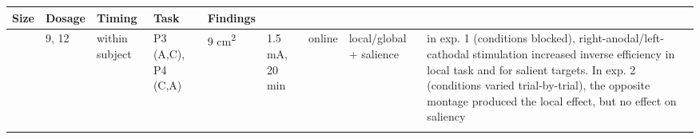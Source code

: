 \documentclass[11pt,]{memoir}
\begin{document}
\begin{longtable}[]{@{}lllllllll@{}}
\begin{minipage}[b]{0.04\columnwidth}
Size\strut
\end{minipage} & \begin{minipage}[b]{0.05\columnwidth}\raggedright
Dosage\strut
\end{minipage} & \begin{minipage}[b]{0.05\columnwidth}\raggedright
Timing\strut
\end{minipage} & \begin{minipage}[b]{0.08\columnwidth}\raggedright
Task\strut
\end{minipage} & \begin{minipage}[b]{0.27\columnwidth}\raggedright
Findings\strut
\end{minipage}\tabularnewline
\midrule
\endhead
\begin{minipage}[t]{0.08\columnwidth}\raggedright
\textcite{Bardi2013}\strut
\end{minipage} & \begin{minipage}[t]{0.03\columnwidth}\raggedright
9,
12\strut
\end{minipage} & \begin{minipage}[t]{0.05\columnwidth}\raggedright
within
subject\strut
\end{minipage} & \begin{minipage}[t]{0.12\columnwidth}\raggedright
P3 (A,C), P4 (C,A)\strut
\end{minipage} & \begin{minipage}[t]{0.04\columnwidth}\raggedright
9
cm\textsuperscript{2}\strut
\end{minipage} & \begin{minipage}[t]{0.05\columnwidth}\raggedright
1.5
mA, 20
min\strut
\end{minipage} & \begin{minipage}[t]{0.05\columnwidth}\raggedright
online\strut
\end{minipage} & \begin{minipage}[t]{0.08\columnwidth}\raggedright
local/global
+ salience\strut
\end{minipage} & \begin{minipage}[t]{0.27\columnwidth}\raggedright
in exp. 1 (conditions blocked),
right-anodal/left-cathodal stimulation increased
inverse efficiency in local task and for salient
targets. In exp. 2 (conditions varied
trial-by-trial), the opposite montage produced the
local effect, but no effect on saliency\strut
\end{minipage}\tabularnewline
\begin{minipage}[t]{0.08\columnwidth}\raggedright

\end{minipage}
\end{longtable}
\end{document}
